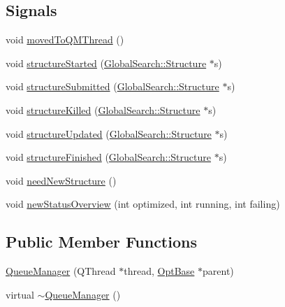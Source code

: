 \subsection*{Signals}
\begin{DoxyCompactItemize}
\item 
void \hyperlink{classGlobalSearch_1_1QueueManager_a1453d56d967bc6ddaaca951c5a7d8c8f}{moved\-To\-Q\-M\-Thread} ()
\item 
void \hyperlink{classGlobalSearch_1_1QueueManager_a4309c24054c4752705f1d66d08358c9f}{structure\-Started} (\hyperlink{classGlobalSearch_1_1Structure}{Global\-Search\-::\-Structure} $\ast$s)
\item 
void \hyperlink{classGlobalSearch_1_1QueueManager_a97ce1e692cd752d62ebea8b2c56e1cd2}{structure\-Submitted} (\hyperlink{classGlobalSearch_1_1Structure}{Global\-Search\-::\-Structure} $\ast$s)
\item 
void \hyperlink{classGlobalSearch_1_1QueueManager_ad6e65416801d0cad4086fafb03990273}{structure\-Killed} (\hyperlink{classGlobalSearch_1_1Structure}{Global\-Search\-::\-Structure} $\ast$s)
\item 
void \hyperlink{classGlobalSearch_1_1QueueManager_aaf98cf54afb9751e185a5450c32f4595}{structure\-Updated} (\hyperlink{classGlobalSearch_1_1Structure}{Global\-Search\-::\-Structure} $\ast$s)
\item 
void \hyperlink{classGlobalSearch_1_1QueueManager_a9ce76b6d4be1aaa3e1f04724f9baa03a}{structure\-Finished} (\hyperlink{classGlobalSearch_1_1Structure}{Global\-Search\-::\-Structure} $\ast$s)
\item 
void \hyperlink{classGlobalSearch_1_1QueueManager_a4b50dbd51e53b1d0d5cb93e9d7380c1c}{need\-New\-Structure} ()
\item 
void \hyperlink{classGlobalSearch_1_1QueueManager_af37eb7a9e54e347a81dc3a1e373c8d54}{new\-Status\-Overview} (int optimized, int running, int failing)
\end{DoxyCompactItemize}
\subsection*{Public Member Functions}
\begin{DoxyCompactItemize}
\item 
\hyperlink{classGlobalSearch_1_1QueueManager_a41ab0186ccec173fe9400368ca2573be}{Queue\-Manager} (Q\-Thread $\ast$thread, \hyperlink{classGlobalSearch_1_1OptBase}{Opt\-Base} $\ast$parent)
\item 
virtual \hyperlink{classGlobalSearch_1_1QueueManager_a6eb307bcd037cd493d81dee2eeb87a52}{$\sim$\-Queue\-Manager} ()
\end{DoxyCompactItemize}

